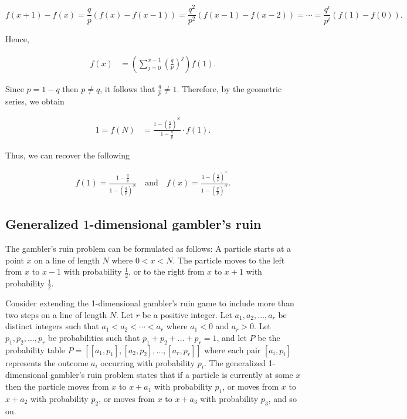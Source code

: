 \documentclass[reqno]{amsart}
\theoremstyle{definition}
\theoremstyle{definition}
\theoremstyle{remark}
\begin{document}
\begin{equation*}
    f(x+1)-f(x)=\frac{q}{p}\left(f(x)-f(x-1)\right)=\frac{q^2}{p^2}\left(f(x-1)-f(x-2)\right)=\cdots= \frac{q^i}{p^i}\left(f(1)-f(0)\right).
\end{equation*}

Hence, 

\begin{align*}
    f(x)&= \left ( \sum_{j=0}^{x-1}\left(\frac{q}{p}\right)^j \right ) f(1).
\end{align*}

Since $p=1-q$ then $p\neq q$, it follows that $\frac{q}{p}\neq 1$. Therefore, by the geometric series, we obtain

\begin{align*}
    1=f(N)&=\frac{1-\left(\frac{q}{p}\right)^N}{1-\frac{q}{p}} \cdot f(1).
\end{align*}

Thus, we can recover the following

\begin{align*}
 f(1)=\frac{1-\frac{q}{p}}{1-\left(\frac{q}{p}\right)^N}
\quad \text{and} \quad
 f(x)=\frac{1-\left(\frac{q}{p}\right)^x}{1-\left(\frac{q}{p}\right)^N}.
\end{align*}

\subsection{Generalized $1$-dimensional gambler's ruin}
The gambler's ruin problem can be formulated as follows: A particle starts at a point $x$ on a line of length $N$ where $0<x<N$. The particle moves to the left from $x$ to $x-1$ with probability $\frac{1}{2}$, or to the right from $x$ to $x+1$ with probability $\frac{1}{2}$. 


Consider extending the 1-dimensional gambler's ruin game to include more than two steps on a line of length $N$. Let $r$ be a positive integer. Let $a_1,a_2,\ldots , a_r$ be distinct integers such that $a_1<a_2<\cdots<a_r$ where $a_1<0$ and $a_r>0$. Let $p_1, p_2,\ldots,p_r$ be probabilities such that $p_1+p_2+\ldots + p_r=1$, and let $P$  be the probability table $P=[[a_1,p_1], [a_2,p_2],\ldots , [a_r,p_r]]$ where each pair $[a_i,p_i]$ represents the outcome $a_i$ occurring with probability $p_i$. The generalized 1-dimensional gambler's ruin problem states that if a particle is currently at some $x$ then the particle moves from $x$ to $x+a_1$ with probability $p_1$, or moves from $x$ to $x+a_2$ with probability $p_2$, or moves from $x$ to $x+a_3$ with probability $p_3$, and so on.
\end{document}
